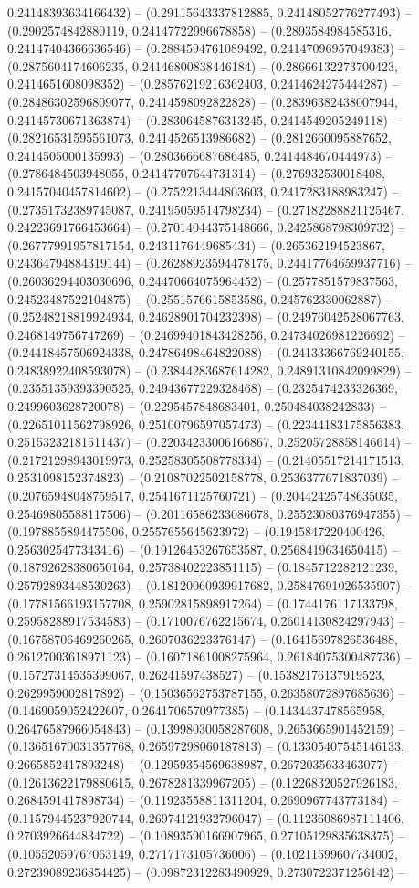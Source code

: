 0.24148393634166432) -- (0.29115643337812885, 0.24148052776277493) -- (0.2902574842880119, 0.24147722996678858) -- (0.2893584984585316, 0.24147404366636546) -- (0.2884594761089492, 0.24147096957049383) -- (0.2875604174606235, 0.24146800838446184) -- (0.28666132273700423, 0.2414651608098352) -- (0.28576219216362403, 0.2414624275444287) -- (0.28486302596809077, 0.2414598092822828) -- (0.28396382438007944, 0.24145730671363874) -- (0.2830645876313245, 0.2414549205249118) -- (0.28216531595561073, 0.2414526513986682) -- (0.2812660095887652, 0.2414505000135993) -- (0.2803666687686485, 0.2414484670444973) -- (0.2786484503948055, 0.24147707644731314) -- (0.276932530018408, 0.24157040457814602) -- (0.2752213444803603, 0.2417283188983247) -- (0.27351732389745087, 0.24195059514798234) -- (0.27182288821125467, 0.24223691766453664) -- (0.27014044375148666, 0.2425868798309732) -- (0.26777991957817154, 0.2431176449685434) -- (0.265362194523867, 0.24364794884319144) -- (0.26288923594478175, 0.24417764659937716) -- (0.26036294403030696, 0.24470664075964452) -- (0.2577851579837563, 0.24523487522104875) -- (0.2551576615853586, 0.245762330062887) -- (0.25248218819924934, 0.24628901704232398) -- (0.24976042528067763, 0.2468149756747269) -- (0.24699401843428256, 0.24734026981226692) -- (0.24418457506924338, 0.24786498464822088) -- (0.24133366769240155, 0.24838922408593078) -- (0.23844283687614282, 0.24891310842099829) -- (0.23551359393390525, 0.24943677229328468) -- (0.2325474233326369, 0.2499603628720078) -- (0.2295457848683401, 0.250484038242833) -- (0.22651011562798926, 0.25100796597057473) -- (0.22344183175856383, 0.25153232181511437) -- (0.22034233006166867, 0.25205728858146614) -- (0.21721298943019973, 0.25258305508778334) -- (0.21405517214171513, 0.2531098152374823) -- (0.21087022502158778, 0.2536377671837039) -- (0.20765948048759517, 0.2541671125760721) -- (0.20442425748635035, 0.25469805588117506) -- (0.20116586233086678, 0.25523080376947355) -- (0.1978855894475506, 0.2557655645623972) -- (0.1945847220400426, 0.2563025477343416) -- (0.19126453267653587, 0.2568419634650415) -- (0.18792628380650164, 0.25738402223851115) -- (0.1845712282121239, 0.25792893448530263) -- (0.18120060939917682, 0.25847691026535907) -- (0.17781566193157708, 0.25902815898917264) -- (0.1744176117133798, 0.25958288917534583) -- (0.1710076762215674, 0.26014130824297943) -- (0.16758706469260265, 0.2607036223376147) -- (0.16415697826536488, 0.26127003618971123) -- (0.16071861008275964, 0.26184075300487736) -- (0.15727314535399067, 0.26241597438527) -- (0.15382176137919523, 0.2629959002817892) -- (0.15036562753787155, 0.26358072897685636) -- (0.1469059052422607, 0.2641706570977385) -- (0.1434437478565958, 0.26476587966054843) -- (0.13998030058287608, 0.2653665901452159) -- (0.13651670031357768, 0.26597298060187813) -- (0.13305407545146133, 0.2665852417893248) -- (0.12959354569638987, 0.2672035633463077) -- (0.12613622179880615, 0.2678281339967205) -- (0.12268320527926183, 0.2684591417898734) -- (0.11923558811311204, 0.2690967743773184) -- (0.11579445237920744, 0.26974121932796047) -- (0.11236086987111406, 0.2703926644834722) -- (0.10893590166907965, 0.27105129835638375) -- (0.10552059767063149, 0.2717173105736006) -- (0.10211599607734002, 0.27239089236854425) -- (0.09872312283490929, 0.2730722371256142) -- 